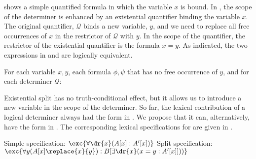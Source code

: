 \documentclass[output=paper]{langsci/langscibook}
\begin{document}
 shows a simple quantified formula in which the variable $x$ is bound. In , the scope of the determiner is enhanced by an existential quantifier binding the variable $x$. 
The original quantifier, $\mathcal{Q}$ binds a new variable, $y$, and we need to replace all free occurrences of $x$ in the restrictor of $\mathcal{Q}$ with $y$. In the scope of the quantifier, the restrictor of the existential quantifier is the formula $x=y$. 
As indicated, the two expressions in   and  are logically equivalent. 


\ea \label{exist-split}
For each variable $x, y$, each formula $\phi, \psi$ that has no free occurrence of $y$, and for each determiner $\mathcal{Q}$:
\begin{xlist}
\end{xlist}
\z 


Existential split has no truth-conditional effect, but it allows us to introduce a new variable in the scope of the determiner.
So far, the lexical contribution of a logical determiner always had the form in . We propose that it can, alternatively, have the form in . 
The corresponding lexical specifications for  are given in .

\ea \label{le-every-split}
\begin{xlist}
\ex Simple specification: $\exc{\forall \dr{x} (A[x] : A'[x])}$
\ex Split specification: \label{def-every-split}
$\exc{\forall y (A[x]\replace{x}{y}) : B[\exists \dr{x} (x = y : A'[x]]))}$
\end{xlist}
\z 
\end{document}
